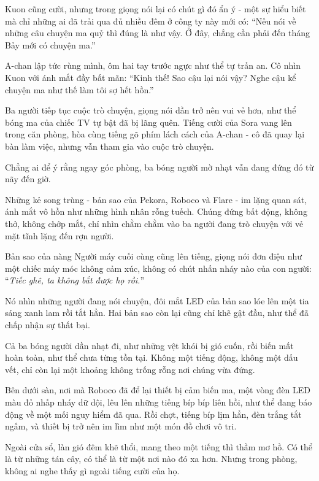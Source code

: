 \documentclass[../main.tex]{subfiles}
\begin{document}
Kuon cũng cười, nhưng trong giọng nói lại có chút gì đó ẩn ý - một sự hiểu biết mà chỉ những ai đã trải qua đủ nhiều đêm ở công ty này mới có: ``Nếu nói về những câu chuyện ma quỷ thì đúng là như vậy. Ở đây, chẳng cần phải đến tháng Bảy mới có chuyện ma.''

A-chan lập tức rùng mình, ôm hai tay trước ngực như thể tự trấn an. Cô nhìn Kuon với ánh mắt đầy bất mãn: ``Kinh thế! Sao cậu lại nói vậy? Nghe cậu kể chuyện ma như thế làm tôi sợ hết hồn.''

Ba người tiếp tục cuộc trò chuyện, giọng nói dần trở nên vui vẻ hơn, như thể bóng ma của chiếc TV tự bật đã bị lãng quên. Tiếng cười của Sora vang lên trong căn phòng, hòa cùng tiếng gõ phím lách cách của A-chan - cô đã quay lại bàn làm việc, nhưng vẫn tham gia vào cuộc trò chuyện.

Chẳng ai để ý rằng ngay góc phòng, ba bóng người mờ nhạt vẫn đang đứng đó từ nãy đến giờ.

Những kẻ song trùng - bản sao của Pekora, Roboco và Flare - im lặng quan sát, ánh mắt vô hồn như những hình nhân rỗng tuếch. Chúng đứng bất động, không thở, không chớp mắt, chỉ nhìn chằm chằm vào ba người đang trò chuyện với vẻ mặt tĩnh lặng đến rợn người.


Bản sao của nàng Người máy cuối cùng cũng lên tiếng, giọng nói đơn điệu như một chiếc máy móc không cảm xúc, không có chút nhấn nháy nào của con người: ``\emph{Tiếc ghê, ta không bắt được họ rồi.}''

Nó nhìn những người đang nói chuyện, đôi mắt LED của bản sao lóe lên một tia sáng xanh lam rồi tắt hẳn. Hai bản sao còn lại cũng chỉ khẽ gật đầu, như thể đã chấp nhận sự thất bại.

Cả ba bóng người dần nhạt đi, như những vệt khói bị gió cuốn, rồi biến mất hoàn toàn, như thể chưa từng tồn tại. Không một tiếng động, không một dấu vết, chỉ còn lại một khoảng không trống rỗng nơi chúng vừa đứng.

Bên dưới sàn, nơi mà Roboco đã để lại thiết bị cảm biến ma, một vòng đèn LED màu đỏ nhấp nháy dữ dội, lêu lên những tiếng bíp bíp liên hồi, như thể đang báo động về một mối nguy hiểm đã qua. Rồi chợt, tiếng bíp lịm hẳn, đèn trắng tắt ngấm, và thiết bị trở nên im lìm như một món đồ chơi vô tri.


Ngoài cửa sổ, làn gió đêm khẽ thổi, mang theo một tiếng thì thầm mơ hồ. Có thể là từ những tán cây, có thể là từ một nơi nào đó xa hơn. Nhưng trong phòng, không ai nghe thấy gì ngoài tiếng cười của họ.
\end{document}
